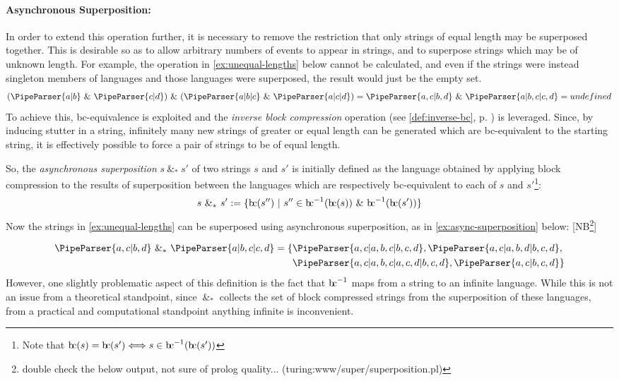 \documentclass[a4paper,12pt,leqno]{article}
\newcommand{\bc}{{\rm b\!c}}
\newcommand{\vph}[1]{\vphantom{#1}}
\newcommand{\ebox}[1]{\fbox{$\vph{'(),}#1$}}
\renewcommand{\sp}{~\&~}
\newcommand{\spasync}{~\&_*~}
\newcommand{\EventString}[1]{
	\renewcommand*{\do}[1]{\ebox{##1}}%
	\PipeParser{#1}
}
\newcommand{\selfnote}[1]{{\color{red}[NB\footnote{{\color{red}#1}}]}}
\newcommand{\nb}{\selfnote}
\begin{document}
\paragraph{Asynchronous Superposition:}\label{para:str-op-sp-async}
In order to extend this operation further, it is necessary to remove the restriction that only strings of equal length may be superposed together. This is desirable so as to allow arbitrary numbers of events to appear in strings, and to superpose strings which may be of unknown length. For example, the operation in \cref{ex:unequal-lengths} below cannot be calculated, and even if the strings were instead singleton members of languages and those languages were superposed, the result would just be the empty set.
\begin{align}\label{ex:unequal-lengths}
	(\EventString{a|b} \sp \EventString{c|d}) \sp (\EventString{a|b|c} \sp \EventString{a|c|d})
	= \EventString{a,c|b,d} \sp \EventString{a|b,c|c,d}
	= undefined
\end{align}
To achieve this, \bc-equivalence is exploited and the \textit{inverse block compression} operation (see \cref{def:inverse-bc}, p. \pageref{def:inverse-bc}) is leveraged. Since, by inducing stutter in a string, infinitely many new strings of greater or equal length can be generated which are \bc-equivalent to the starting string, it is effectively possible to force a pair of strings to be of equal length.

So, the \textit{asynchronous superposition} $s \spasync s'$ of two strings $s$ and $s'$ is initially defined as the language obtained by applying block compression to the results of superposition between the languages which are respectively \bc-equivalent to each of $s$ and $s'$\footnote{Note that $\bc(s) = \bc(s') \Longleftrightarrow s \in \bc^{-1}(\bc(s'))$}:
\begin{align}\label{def:initial-async-superposition}
	s \spasync s' := \{\bc(s'') ~|~ s'' \in \bc^{-1}(\bc(s)) \sp \bc^{-1}(\bc(s'))\}
\end{align}
Now the strings in \cref{ex:unequal-lengths} can be superposed using asynchronous superposition, as in \cref{ex:async-superposition} below: \nb{double check the below output, not sure of prolog quality... (turing:www/super/superposition.pl)}

\begin{align}\label{ex:async-superposition}
	\EventString{a,c|b,d} \spasync \EventString{a|b,c|c,d} = \{&\EventString{a,c|a,b,c|b,c,d}, \EventString{a,c|a,b,d|b,c,d},\\&\EventString{a,c|a,b,c|a,c,d|b,c,d}, \EventString{a,c|b,c,d}\}\notag
\end{align}
However, one slightly problematic aspect of this definition is the fact that $\bc^{-1}$ maps from a string to an infinite language. While this is not an issue from a theoretical standpoint, since $\spasync$ collects the set of block compressed strings from the superposition of these languages, from a practical and computational standpoint anything infinite is inconvenient.
\end{document}

